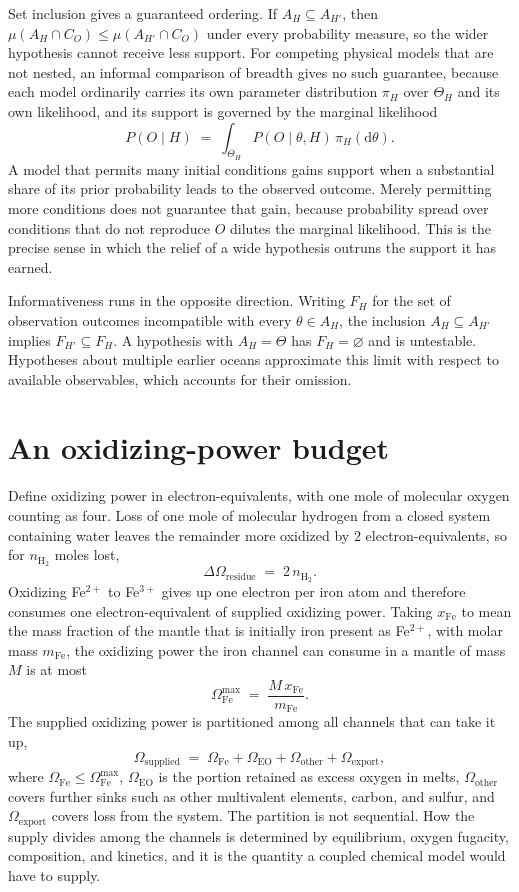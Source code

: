 \documentclass[11pt]{article}
\begin{document}
Set inclusion gives a guaranteed ordering. If $A_H \subseteq A_{H'}$, then $\mu(A_H \cap C_O) \le \mu(A_{H'} \cap C_O)$ under every probability measure, so the wider hypothesis cannot receive less support. For competing physical models that are not nested, an informal comparison of breadth gives no such guarantee, because each model ordinarily carries its own parameter distribution $\pi_H$ over $\Theta_H$ and its own likelihood, and its support is governed by the marginal likelihood
\[
P(O \mid H) \;=\; \int_{\Theta_H} P(O \mid \theta, H)\,\pi_H(\mathrm{d}\theta).
\]
A model that permits many initial conditions gains support when a substantial share of its prior probability leads to the observed outcome. Merely permitting more conditions does not guarantee that gain, because probability spread over conditions that do not reproduce $O$ dilutes the marginal likelihood. This is the precise sense in which the relief of a wide hypothesis outruns the support it has earned.

Informativeness runs in the opposite direction. Writing $F_H$ for the set of observation outcomes incompatible with every $\theta \in A_H$, the inclusion $A_H \subseteq A_{H'}$ implies $F_{H'} \subseteq F_H$. A hypothesis with $A_H = \Theta$ has $F_H = \varnothing$ and is untestable. Hypotheses about multiple earlier oceans approximate this limit with respect to available observables, which accounts for their omission.

\section{An oxidizing-power budget}

Define oxidizing power in electron-equivalents, with one mole of molecular oxygen counting as four. Loss of one mole of molecular hydrogen from a closed system containing water leaves the remainder more oxidized by $2$ electron-equivalents, so for $n_{\mathrm{H_2}}$ moles lost,
\[
\Delta\Omega_{\text{residue}} \;=\; 2\,n_{\mathrm{H_2}} .
\]
Oxidizing Fe$^{2+}$ to Fe$^{3+}$ gives up one electron per iron atom and therefore consumes one electron-equivalent of supplied oxidizing power. Taking $x_{\mathrm{Fe}}$ to mean the mass fraction of the mantle that is initially iron present as Fe$^{2+}$, with molar mass $m_{\mathrm{Fe}}$, the oxidizing power the iron channel can consume in a mantle of mass $M$ is at most
\[
\Omega_{\mathrm{Fe}}^{\max} \;=\; \frac{M\,x_{\mathrm{Fe}}}{m_{\mathrm{Fe}}}.
\]
The supplied oxidizing power is partitioned among all channels that can take it up,
\[
\Omega_{\text{supplied}} \;=\; \Omega_{\mathrm{Fe}} + \Omega_{\mathrm{EO}} + \Omega_{\text{other}} + \Omega_{\text{export}},
\]
where $\Omega_{\mathrm{Fe}} \le \Omega_{\mathrm{Fe}}^{\max}$, $\Omega_{\mathrm{EO}}$ is the portion retained as excess oxygen in melts, $\Omega_{\text{other}}$ covers further sinks such as other multivalent elements, carbon, and sulfur, and $\Omega_{\text{export}}$ covers loss from the system. The partition is not sequential. How the supply divides among the channels is determined by equilibrium, oxygen fugacity, composition, and kinetics, and it is the quantity a coupled chemical model would have to supply.
\end{document}

